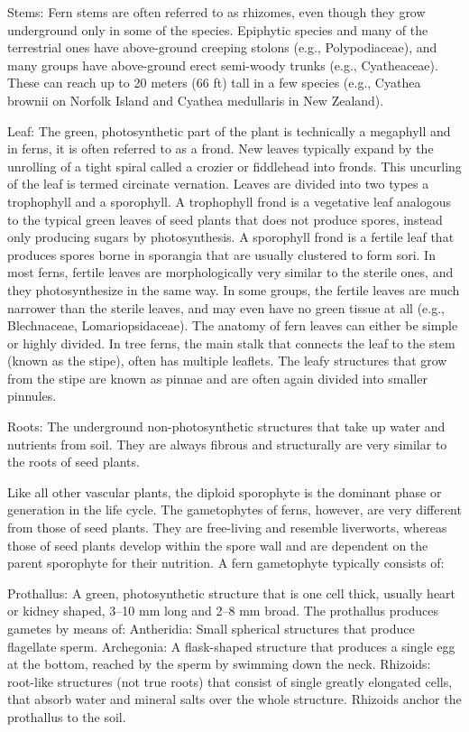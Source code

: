 Stems: Fern stems are often referred to as rhizomes, even though they grow underground only in some of the species. Epiphytic species and many of the terrestrial ones have above-ground creeping stolons (e.g., Polypodiaceae), and many groups have above-ground erect semi-woody trunks (e.g., Cyatheaceae). These can reach up to 20 meters (66 ft) tall in a few species (e.g., Cyathea brownii on Norfolk Island and Cyathea medullaris in New Zealand).

Leaf: The green, photosynthetic part of the plant is technically a megaphyll and in ferns, it is often referred to as a frond. New leaves typically expand by the unrolling of a tight spiral called a crozier or fiddlehead into fronds. This uncurling of the leaf is termed circinate vernation. Leaves are divided into two types a trophophyll and a sporophyll. A trophophyll frond is a vegetative leaf analogous to the typical green leaves of seed plants that does not produce spores, instead only producing sugars by photosynthesis. A sporophyll frond is a fertile leaf that produces spores borne in sporangia that are usually clustered to form sori. In most ferns, fertile leaves are morphologically very similar to the sterile ones, and they photosynthesize in the same way. In some groups, the fertile leaves are much narrower than the sterile leaves, and may even have no green tissue at all (e.g., Blechnaceae, Lomariopsidaceae). The anatomy of fern leaves can either be simple or highly divided. In tree ferns, the main stalk that connects the leaf to the stem (known as the stipe), often has multiple leaflets. The leafy structures that grow from the stipe are known as pinnae and are often again divided into smaller pinnules.

Roots: The underground non-photosynthetic structures that take up water and nutrients from soil. They are always fibrous and structurally are very similar to the roots of seed plants.

Like all other vascular plants, the diploid sporophyte is the dominant phase or generation in the life cycle. The gametophytes of ferns, however, are very different from those of seed plants. They are free-living and resemble liverworts, whereas those of seed plants develop within the spore wall and are dependent on the parent sporophyte for their nutrition. A fern gametophyte typically consists of:

Prothallus: A green, photosynthetic structure that is one cell thick, usually heart or kidney shaped, 3--10 mm long and 2--8 mm broad. The prothallus produces gametes by means of:
Antheridia: Small spherical structures that produce flagellate sperm.
Archegonia: A flask-shaped structure that produces a single egg at the bottom, reached by the sperm by swimming down the neck.
Rhizoids: root-like structures (not true roots) that consist of single greatly elongated cells, that absorb water and mineral salts over the whole structure. Rhizoids anchor the prothallus to the soil.

